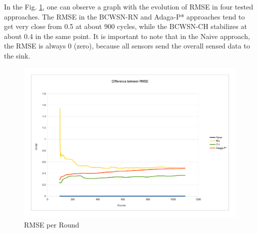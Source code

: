 \documentclass[conference]{IEEEtran}
\begin{document}
% 

In the Fig. \ref{fig:rmse}, one can observe a graph with the evolution of RMSE
in four tested approaches. The RMSE in the BCWSN-RN and Adaga-P* approaches tend
to get very close from 0.5 at about 900 cycles, while the BCWSN-CH stabilizes at
about 0.4 in the same point. It is important to note that in the Naive approach,
the RMSE is always 0 (zero), because all sensors send the overall sensed data to
the sink.

\begin{figure}[!htb]
\centering
	\includegraphics[scale=0.085]{graf_RMSE_.png}
    \caption{RMSE per Round}
    \label{fig:rmse}
\end{figure}
\end{document}
